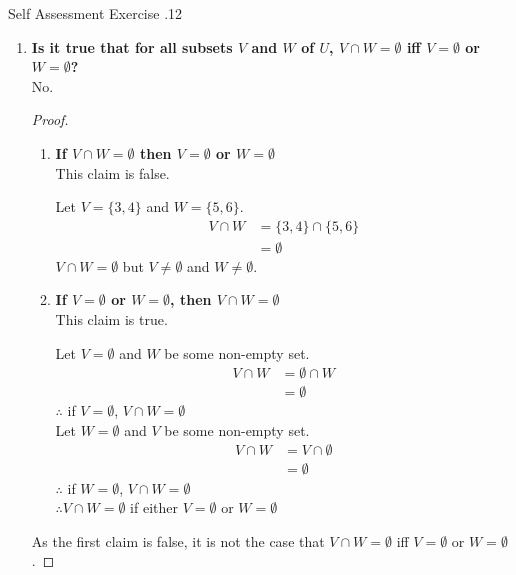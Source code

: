 \documentclass[../notes.tex]{subfiles}
\begin{document}
\begin{exercise}{Self Assessment Exercise \thechapter.12}
\begin{enumerate}
\begin{proof}
						\end{proof}
					\item \textbf{Is it true that for all subsets $V$ and $W$ of $U$, $V \cap W = \emptyset$ iff $V = \emptyset$ or $W = \emptyset$?}\\
						No.
						\begin{proof}
							$ $
							\begin{enumerate}[label=(\roman*)]
								\item \textbf{If $V \cap W = \emptyset$ then $V = \emptyset$ or $W = \emptyset$}\\
									This claim is false.
									\begin{subproof}[Counterexample]
										Let $V = \{3, 4\}$ and $W = \{5, 6\}$.
										\begin{align*}
											V \cap W &= \{3, 4\} \cap \{5, 6\}\\
											&= \emptyset
										\end{align*}
										$V \cap W = \emptyset$ but $V \neq \emptyset$ and $W \neq \emptyset$.
									\end{subproof}
								\item \textbf{If $V = \emptyset$ or $W = \emptyset$, then $V \cap W = \emptyset$}\\
									This claim is true.
									\begin{subproof}[Subproof]
										Let $V = \emptyset$ and $W$ be some non-empty set.
										\begin{align*}
											V \cap W &= \emptyset \cap W\\
											&= \emptyset
										\end{align*}
										$\therefore$ if $V = \emptyset$, $V \cap W = \emptyset$\\
										Let $W = \emptyset$ and $V$ be some non-empty set.
										\begin{align*}
											V \cap W &= V \cap \emptyset\\
											&= \emptyset
										\end{align*}
										$\therefore$ if $W = \emptyset$, $V \cap W = \emptyset$\\
										$\therefore V \cap W = \emptyset$ if either $V = \emptyset$ or $W = \emptyset$
									\end{subproof}
							\end{enumerate}
							As the first claim is false, it is not the case that $V \cap W = \emptyset$ iff $V = \emptyset$ or $W = \emptyset$.
						\end{proof}

\end{enumerate}
\end{exercise}
\end{document}
